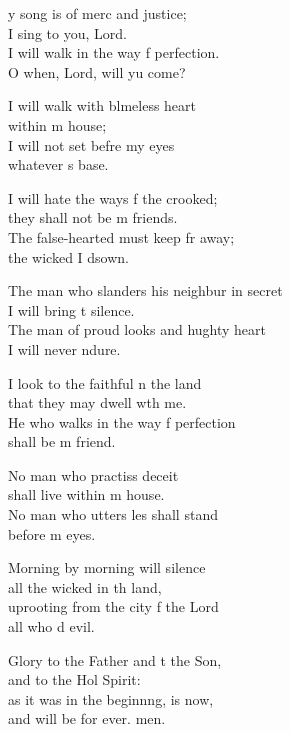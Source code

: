\settowidth{\versewidth}{The man who slanders his neighbor in secret *}
\begin{psalmverse}%
  \begin{patverse}
y song is of merc and justice;\Med\\
I sing to you,  Lord.\\
I will walk in the way f perfection.\Med\\
O when, Lord, will yu come?

I will walk with blmeless heart\Med\\
within m house;\\
I will not set befre my eyes\Med\\
whatever \pointup{\i}s base.

I will hate the ways f the crooked;\Med\\
they shall not be m friends.\\
The false-hearted must keep fr away;\Med\\
the wicked I d\pointup{\i}sown.

The man who slanders his neighbur in secret\Med\\
I will bring t silence.\\
The man of proud looks and hughty heart\Med\\
I will never ndure.

I look to the faithful \pointup{\i}n the land\Med\\
that they may dwell w\pointup{\i}th me.\\
He who walks in the way f perfection\Med\\
shall be m friend.

No man who practiss deceit\Med\\
shall live within m house.\\
No man who utters l\pointup{\i}es shall stand\Med\\
before m eyes.

Morning by morning  will silence\Med\\
all the wicked in th land,\\
uprooting from the city f the Lord\Med\\
all who d evil.

Glory to the Father and t the Son,\Med\\
and to the Hol Spirit:\\
as it was in the beginn\pointup{\i}ng, is now,\Med\\
and will be for ever. men.
  \end{patverse}
\end{psalmverse}
\setlength{\leftmargini}{\defleftmargini}  %

